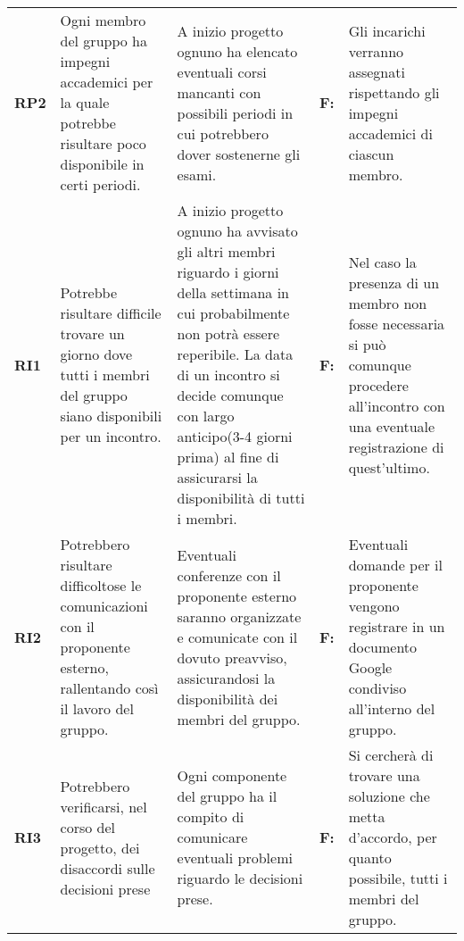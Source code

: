 {\begin{longtable}{C{2.5cm} C{3.25cm} C{3.25cm} C{1.5cm} C{3cm}}
\textbf{RP2} & 
Ogni membro del gruppo ha impegni accademici per la quale potrebbe risultare poco disponibile in certi periodi. & 
A inizio progetto ognuno ha elencato eventuali corsi mancanti con possibili periodi in cui potrebbero dover sostenerne gli esami. &
\textbf{F:}  &
Gli incarichi verranno assegnati rispettando gli impegni accademici di ciascun membro.\\

\textbf{RI1} & 
Potrebbe risultare difficile trovare un giorno dove tutti i membri del gruppo siano disponibili per un incontro. & 
A inizio progetto ognuno ha avvisato gli altri membri riguardo i giorni della settimana in cui probabilmente non potrà essere reperibile. La data di un incontro si decide comunque con largo anticipo(3-4 giorni prima) al fine di assicurarsi la disponibilità di tutti i membri. &
\textbf{F:}  &
Nel caso la presenza di un membro non fosse necessaria si può comunque procedere all'incontro con una eventuale registrazione di quest'ultimo.\\

\textbf{RI2} & 
Potrebbero risultare difficoltose le comunicazioni con il proponente esterno, rallentando così il lavoro del gruppo. & 
Eventuali conferenze con il proponente esterno saranno organizzate e comunicate con il dovuto preavviso, assicurandosi la disponibilità dei membri del gruppo. &
\textbf{F:}  &
Eventuali domande per il proponente vengono registrare in un documento Google condiviso all'interno del gruppo. \\

\textbf{RI3} & 
Potrebbero verificarsi, nel corso del progetto, dei disaccordi sulle decisioni prese & 
Ogni componente del gruppo ha il compito di comunicare eventuali problemi riguardo le decisioni prese. &
\textbf{F:}  &
Si cercherà di trovare una soluzione che metta d'accordo, per quanto possibile, tutti i membri del gruppo. \\


\end{longtable}}
